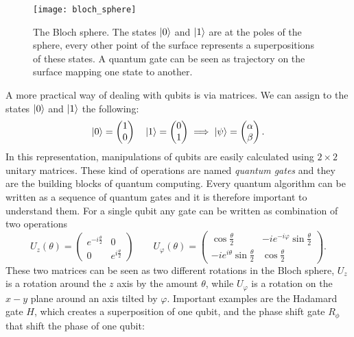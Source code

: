 \begin{figure}[H]
\centering
\texttt{[image: bloch\_sphere]}
\caption{The Bloch sphere. The states $\ket{0}$ and $\ket{1}$ are at the poles of the sphere, every other point of the surface represents a superpositions of these states. A quantum gate can be seen as trajectory on the surface mapping one state to another.}
\label{blochsphere}
\end{figure}

A more practical way of dealing with qubits is via matrices. We can assign to the states $\ket{0}$ and $\ket{1}$ the following:
\begin{equation}
\ket{0} = \begin{pmatrix}
 1 \\
 0
\end{pmatrix} \quad
\ket{1} = \begin{pmatrix}
 0 \\
 1
\end{pmatrix} \implies \ket{\psi} = \begin{pmatrix}
 \alpha \\
 \beta
\end{pmatrix}.
\end{equation}
In this representation, manipulations of qubits are easily calculated using $2\times2$ unitary matrices. These kind of operations are named \emph{quantum gates} and they are the building blocks of quantum computing. Every quantum algorithm can be written as a sequence of quantum gates and it is therefore important to understand them. For a single qubit any gate can be written as combination of two operations \cite{hempel}
\begin{equation}
\label{quantumgates}
U_z(\theta) =  \begin{pmatrix}
 e^{-i\frac{\theta}{2}} & 0 \\
 0 & e^{i\frac{\theta}{2}}
\end{pmatrix} \qquad U_\varphi(\theta) = \begin{pmatrix}
\cos\frac{\theta}{2} & -i e^{-i\varphi}\sin\frac{\theta}{2} \\
-ie^{i\theta}\sin\frac{\theta}{2} & \cos\frac{\theta}{2}
\end{pmatrix}.
\end{equation}
These two matrices can be seen as two different rotations in the Bloch sphere, $U_z$ is a rotation around the $z$ axis by the amount $\theta$, while $U_\varphi$ is a rotation on the $x-y$ plane around an axis tilted by $\varphi$. Important examples are the Hadamard gate $H$, which creates a superposition of one qubit, and the phase shift gate $R_\phi$ that shift the phase of one qubit:
